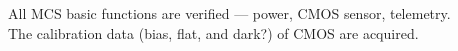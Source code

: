 

\begin{itembox}[l]{}
All MCS basic functions are verified --- power, CMOS sensor, telemetry.  \\
The calibration data (bias, flat, and dark?) of CMOS are acquired.

\end{itembox}

